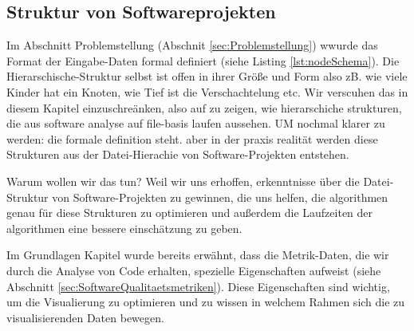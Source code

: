 \subsection{Struktur von Softwareprojekten} \label{sec:strukturVonSoftwareprojekten}    

Im Abschnitt Problemstellung (Abschnit \ref{sec:Problemstellung}) wwurde das Format der Eingabe-Daten formal definiert (siehe Listing \ref{lst:nodeSchema}). Die Hierarschische-Struktur selbst ist offen in ihrer Größe und Form also zB. wie viele Kinder hat ein Knoten, wie Tief ist die Verschachtelung etc. Wir verscuhen das in diesem Kapitel einzuschreänken, also auf zu zeigen, wie hierarschiche strukturen, die aus software analyse auf file-basis laufen aussehen. UM nochmal klarer zu werden: die formale definition steht. aber in der praxis realität werden diese Strukturen aus der Datei-Hierachie von Software-Projekten entstehen. 

Warum wollen wir das tun? Weil wir uns erhoffen, erkenntnisse über die Datei-Struktur von Software-Projekten zu gewinnen, die uns helfen, die algorithmen genau für diese Strukturen zu optimieren und außerdem die Laufzeiten der algorithmen eine bessere einschätzung zu geben.

Im Grundlagen Kapitel wurde bereits erwähnt, dass die Metrik-Daten, die wir durch die Analyse von Code erhalten, spezielle Eigenschaften aufweist (siehe Abschnitt \ref{sec:SoftwareQualitaetsmetriken}). Diese Eigenschaften sind wichtig, um die Visualierung zu optimieren und zu wissen in welchem Rahmen sich die zu visualisierenden Daten bewegen. 


